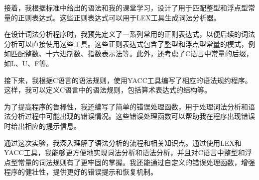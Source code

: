 \documentclass[lang=cn,11pt,a4paper]{elegantpaper}
\begin{document}
接着，我根据标准中给出的语法和我的课堂学习，设计了用于匹配整型和浮点型常量的正则表达式。这些正则表达式可以用于LEX工具生成词法分析器。

在设计词法分析程序时，我预先定义了一系列常用的正则表达式，以便后续的词法分析可以直接使用这些工具。这些正则表达式包含了整型和浮点型常量的模式，例如匹配整数、十六进制数、指数表示法等。此外，还考虑了C语言中常量的后缀，如L、U、F等。

接下来，我根据C语言的语法规则，使用YACC工具编写了相应的语法规约程序。这样，我可以定义C语言中的语法规则，包括算术表达式的结构等。

为了提高程序的鲁棒性，我还编写了简单的错误处理函数，用于处理词法分析和语法分析过程中可能出现的错误情况。这些错误处理函数可以帮助我在程序出现错误时给出相应的提示信息。

通过这次实验，我深入理解了语法分析的流程和相关知识点。通过使用LEX和YACC工具，我能够更方便地实现词法分析和语法分析，并且对C语言中整型和浮点型常量的词法规则有了更牢固的掌握。我还能通过自定义的错误处理函数，增强程序的健壮性，提供更好的错误提示和恢复机制。





\end{document}
